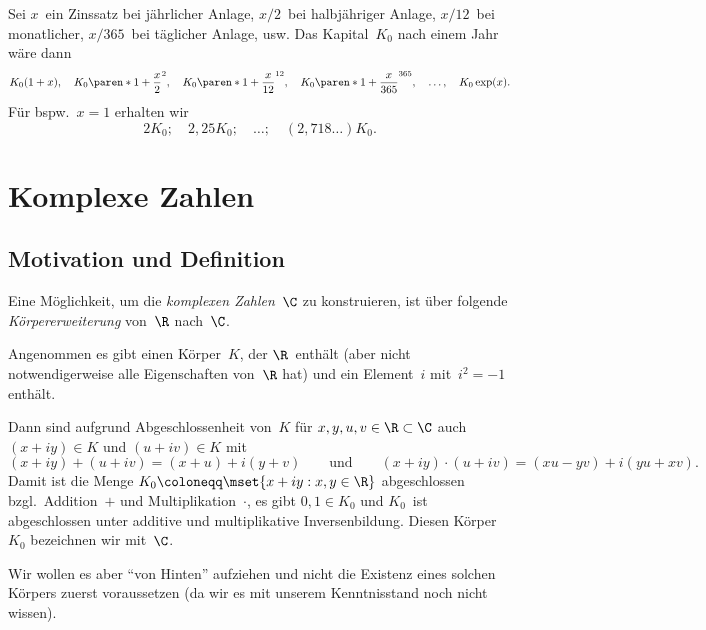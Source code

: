 \documentclass[a4paper]{article}
\begin{document}

\begin{example}
    Sei $x$~ein Zinssatz bei jährlicher Anlage, $x/2$~bei halbjähriger Anlage, $x/12$~bei monatlicher, $x/365$~bei täglicher Anlage, usw. Das Kapital~$K_0$ nach einem Jahr wäre dann
    \begin{equation*}
        K_0(1+x), \quad K_0\paren*{1+\frac{x}{2}}^2, \quad K_0\paren*{1+\frac{x}{12}}^{12}, \quad K_0\paren*{1+\frac{x}{365}}^{365}, \quad \ldots, \quad K_0 \exp(x).
    \end{equation*}
    Für bspw.~$x = 1$ erhalten wir
    \begin{equation*}
        2K_0; \quad 2,25K_0; \quad \ldots; \quad (2,718\ldots)K_0.
    \end{equation*}
\end{example}

\section{Komplexe Zahlen}

\subsection{Motivation und Definition}

Eine Möglichkeit, um die \emph{komplexen Zahlen}~$\C$ zu konstruieren, ist über folgende \emph{Körpererweiterung} von~$\R$ nach~$\C$.

Angenommen es gibt einen Körper~$K$, der $\R$~enthält (aber nicht notwendigerweise alle Eigenschaften von~$\R$ hat) und ein Element~$i$ mit~$i^2 = -1$ enthält.

Dann sind aufgrund Abgeschlossenheit von~$K$ für $x,y,u,v \in \R \subset \C$ auch $(x+iy) \in K$ und $(u+iv) \in K$ mit
\begin{equation*}
    (x+iy) + (u+iv) = (x+u) + i(y+v) \qquad\text{und}\qquad (x+iy) \cdot (u+iv) = (xu-yv) + i(yu+xv).
\end{equation*}
Damit ist die Menge $K_0 \coloneqq \mset{x+iy : x,y \in \R}$ abgeschlossen bzgl.\ Addition~$+$ und Multiplikation~$\cdot$, es gibt $0, 1 \in K_0$ und $K_0$~ist abgeschlossen unter additive und multiplikative Inversenbildung. Diesen Körper~$K_0$ bezeichnen wir mit~$\C$.

Wir wollen es aber "`von Hinten"' aufziehen und nicht die Existenz eines solchen Körpers zuerst voraussetzen (da wir es mit unserem Kenntnisstand noch nicht wissen).
\end{document}
